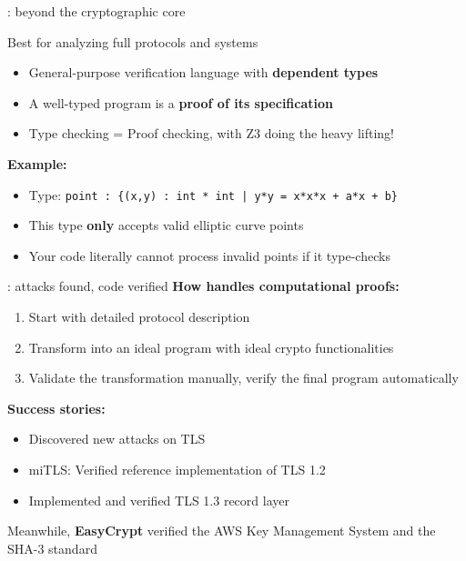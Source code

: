 \ifdefined\PRESENTATION\else\PassOptionsToClass{handout}{beamer}\fi\documentclass[aspectratio=169, lualatex]{beamer}
\begin{document}
\begin{frame}{\fstar: beyond the cryptographic core}
	\begin{center}
		\Large
		Best for analyzing full protocols and systems
	\end{center}
	\vspace{0.5em}
	\begin{itemize}
		\item General-purpose verification language with \textbf{dependent types}
		\item A well-typed program is a \textbf{proof of its specification}
		\item Type checking = Proof checking, with Z3 doing the heavy lifting!
	\end{itemize}
	\vspace{0.5em}
	\textbf{Example:}
	\begin{itemize}
		\item Type: \texttt{point : \{(x,y) : int * int | y*y = x*x*x + a*x + b\}}
		\item This type \textbf{only} accepts valid elliptic curve points
		\item Your code literally cannot process invalid points if it type-checks
	\end{itemize}
\end{frame}

\begin{frame}{\fstar: attacks found, code verified}
	\textbf{How \fstar handles computational proofs:}
	\begin{enumerate}
		\item Start with detailed protocol description
		\item Transform into an ideal program with ideal crypto functionalities
		\item Validate the transformation manually, verify the final program automatically
	\end{enumerate}
	\vspace{0.5em}
	\textbf{Success stories:}
	\begin{itemize}
		\item Discovered new attacks on TLS
		\item miTLS: Verified reference implementation of TLS 1.2
		\item Implemented and verified TLS 1.3 record layer
	\end{itemize}
	\vspace{0.5em}
	\begin{center}
		Meanwhile, \textbf{EasyCrypt} verified the AWS Key Management System and the SHA-3 standard
	\end{center}
\end{frame}
\end{document}
